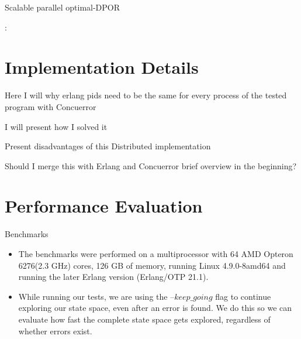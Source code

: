 \begin{frame} {Scalable parallel optimal-DPOR}

:

\begin{itemize}[<+->]

\end{itemize}

\end{frame}


\section{Implementation Details}


\begin{frame} {}

Here I will why erlang pids need to be the same for every process of the tested program with Concuerror

I will present how I solved it

Present disadvantages of this Distributed implementation

Should I merge this with Erlang and Concuerror brief overview in the beginning?

\end{frame}

\section{Performance Evaluation}



\begin{frame}{Benchmarks}

\begin{itemize}
\item The benchmarks were performed on a multiprocessor with 64 AMD Opteron 6276(2.3 GHz) cores, 126 GB of memory, running
Linux 4.9.0-8amd64 and running the later Erlang version (Erlang/OTP 21.1). 
\item While running our tests, we are using the
--$keep\_going$ flag to continue exploring our state space, even after an error is found. We do this so we can evaluate
how fast the complete state space gets explored, regardless of whether errors exist.
\end{itemize}

\end{frame}


